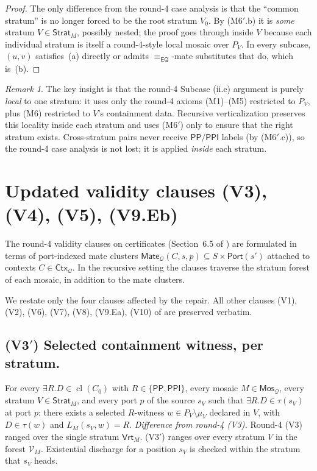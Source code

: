 \documentclass[11pt]{article}
\theoremstyle{definition}
\theoremstyle{remark}
\newtheorem{remark}[theorem]{Remark}
\newcommand{\PP}{\mathsf{PP}}
\newcommand{\PPI}{\mathsf{PPI}}
\newcommand{\EQ}{\mathsf{EQ}}
\newcommand{\Vrt}{\mathsf{Vrt}}
\newcommand{\Mos}{\mathsf{Mos}}
\newcommand{\Ctx}{\mathsf{Ctx}}
\newcommand{\Port}{\mathsf{Port}}
\newcommand{\Mate}{\mathsf{Mate}}
\newcommand{\Q}{\mathcal{Q}}
\newcommand{\Cl}{\operatorname{cl}}
\newcommand{\Stratum}{\mathsf{Strat}}
\newcommand{\eqc}{\equiv_{\EQ}}
\begin{document}
\begin{proof}
The only difference from the round-4 case analysis is that the
``common stratum'' is no longer forced to be the root stratum $V_0$.
By (M6$'$.b) it is \emph{some} stratum $V\in\Stratum_M$, possibly
nested; the proof goes through inside $V$ because each individual
stratum is itself a round-4-style local mosaic over $P_V$.  In every
subcase, $(u,v)$ satisfies~(a) directly or admits $\eqc$-mate
substitutes that do, which is~(b).
\end{proof}

\begin{remark}
The key insight is that the round-4 Subcase (ii.e) argument is
purely \emph{local} to one stratum: it uses only the round-4 axioms
(M1)--(M5) restricted to $P_V$, plus (M6) restricted to $V$'s
containment data.  Recursive verticalization preserves this locality
inside each stratum and uses (M6$'$) only to ensure that the right
stratum exists.  Cross-stratum pairs never receive $\PP/\PPI$ labels
(by (M6$'$.c)), so the round-4 case analysis is not lost; it is
applied \emph{inside} each stratum.
\end{remark}

\section{Updated validity clauses (V3), (V4), (V5), (V9.Eb)}
\label{sec:validity}

The round-4 validity clauses on certificates (Section~6.5 of
\cite{GPT55Repaired}) are formulated in terms of port-indexed mate
clusters $\Mate_\Q(C,s,p)\subseteq S\times\Port(s')$ attached to
contexts $C\in\Ctx_\Q$.  In the recursive setting the clauses traverse
the stratum forest of each mosaic, in addition to the mate clusters.

We restate only the four clauses affected by the repair.  All other
clauses (V1), (V2), (V6), (V7), (V8), (V9.Ea), (V10) of
\cite{GPT55Repaired} are preserved verbatim.

\subsection*{(V3$'$) Selected containment witness, per stratum.}
For every $\exists R.D\in\Cl(C_0)$ with $R\in\{\PP,\PPI\}$, every
mosaic $M\in\Mos_\Q$, every stratum $V\in\Stratum_M$, and every port
$p$ of the source $s_V$ such that $\exists R.D\in\tau(s_V)$ at port
$p$: there exists a selected $R$-witness $w\in P_V\setminus\mu_V$
declared in $V$, with $D\in\tau(w)$ and $L_M(s_V,w)=R$.
\smallskip\noindent
\emph{Difference from round-4 (V3).} Round-4 (V3) ranged over the
single stratum $\Vrt_M$.  (V3$'$) ranges over every stratum $V$
in the forest $\mathcal V_M$.  Existential discharge for a position
$s_V$ is checked within the stratum that $s_V$ heads.
\end{document}
